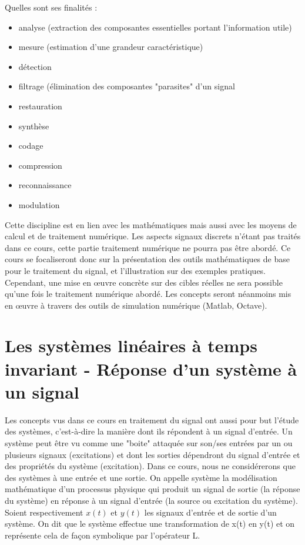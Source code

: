 \documentclass[]{book}
\begin{document}
	Quelles sont ses finalités :
	
	\begin{itemize}
		\item analyse (extraction des composantes essentielles portant l'information utile)
		\item mesure (estimation d'une grandeur caractéristique)
		\item détection
		\item filtrage (élimination des composantes "parasites" d'un signal
		\item restauration
		\item synthèse
		\item codage
		\item compression
		\item reconnaissance
		\item modulation
	\end{itemize}
	
	Cette discipline est en lien avec les mathématiques mais aussi avec les moyens de calcul et de traitement numérique.
	Les aspects signaux discrets n'étant pas traités dans ce cours, cette partie traitement numérique ne pourra pas être abordé. Ce cours se focaliseront donc sur la présentation des outils mathématiques de base pour le traitement du signal, et l'illustration sur des exemples pratiques. Cependant, une mise en œuvre concrète sur des cibles réelles ne sera possible qu'une fois le traitement numérique abordé.
	Les concepts seront néanmoins mis en œuvre à travers des outils de simulation numérique (Matlab, Octave).
	
	\section{Les systèmes linéaires à temps invariant - Réponse d'un système à un signal}
	Les concepts vus dans ce cours en traitement du signal ont aussi pour but l'étude des systèmes, c'est-à-dire la manière dont ils répondent à un signal d'entrée. Un système peut être vu comme une "boite" attaquée sur son/ses entrées par un ou plusieurs signaux (excitations) et dont les sorties dépendront du signal d'entrée et des propriétés du système (excitation). Dans ce cours, nous ne considérerons que des systèmes à une entrée et une sortie. 
	On appelle système la modélisation mathématique d’un processus physique qui produit un signal de sortie (la réponse du système) en réponse à un signal d’entrée (la source ou excitation du système).
	Soient respectivement $x(t)$ et $y(t)$ les signaux d’entrée et de sortie d’un système. On dit que le système effectue une transformation de x(t) en y(t) et on représente cela de façon symbolique par l’opérateur L.
\end{document}
